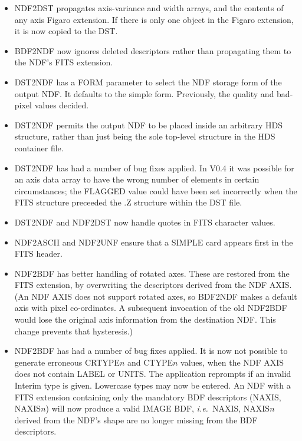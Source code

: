 \begin{itemize}
  \item NDF2DST propagates axis-variance and width arrays, and the
        contents of any axis Figaro extension.  If there is only one
        object in the Figaro extension, it is now copied to the DST.

  \item BDF2NDF now ignores deleted descriptors rather than propagating
        them to the NDF's FITS extension.

  \item DST2NDF has a FORM parameter to select the NDF storage form of
        the output NDF.  It defaults to the simple form.  Previously,
        the quality and bad-pixel values decided.

  \item DST2NDF permits the output NDF to be placed inside an arbitrary
        HDS structure, rather than just being the sole top-level
        structure in the HDS container file.

  \item DST2NDF has had a number of bug fixes applied.  In V0.4 it was
        possible for an axis data array to have the wrong number of
        elements in certain circumstances; the FLAGGED value could have
        been set incorrectly when the FITS structure preceeded the .Z
        structure within the DST file.

  \item DST2NDF and NDF2DST now handle quotes in FITS character values.

  \item NDF2ASCII and NDF2UNF ensure that a SIMPLE card appears first in
        the FITS header.

  \item NDF2BDF has better handling of rotated axes.  These are restored
        from the FITS extension, by overwriting the descriptors derived
        from the NDF AXIS.  (An NDF AXIS does not support rotated axes,
        so BDF2NDF makes a default axis with pixel co-ordinates.  A
        subsequent invocation of the old NDF2BDF would lose the original
        axis information from the destination NDF.  This change prevents
        that hysteresis.)

  \item NDF2BDF has had a number of bug fixes applied.  It is now not
        possible to generate erroneous CRTYPE$n$ and CTYPE$n$ values,
        when the NDF AXIS does not contain LABEL or UNITS.  The
        application reprompts if an invalid Interim type is given.
        Lowercase types may now be entered.  An NDF with a FITS
        extension containing only the mandatory BDF descriptors (NAXIS,
        NAXIS$n$) will now produce a valid IMAGE BDF, {\it i.e.}\ NAXIS,
        NAXIS$n$ derived from the NDF's shape are no longer missing from
        the BDF descriptors.


\end{itemize}
